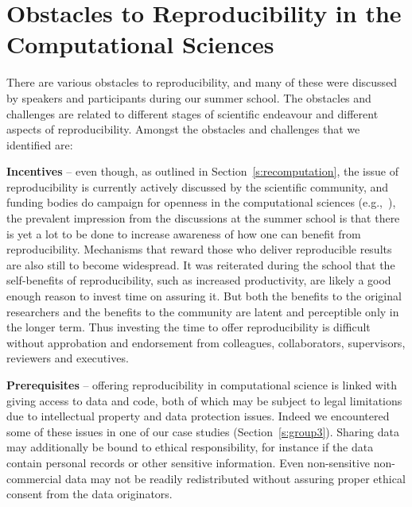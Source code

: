 \section{Obstacles to Reproducibility in the Computational Sciences}
\label{s:obstacles}

There are various obstacles to reproducibility, and many of these were
  discussed by speakers and participants during our summer school.
The obstacles and challenges are related to different stages of scientific 
  endeavour and different aspects of reproducibility.
Amongst the obstacles and challenges that we identified are:

{\bf Incentives} -- even though, as outlined in Section~\ref{s:recomputation}, 
  the issue of reproducibility is
  currently actively discussed by the scientific community, 
  and funding bodies do campaign for
  openness in the computational sciences (e.g.,~\cite{NSF}), 
  the prevalent impression from the discussions at 
  the summer school is that there is yet a lot to be done to increase 
  awareness of how one can benefit from reproducibility.
Mechanisms that reward those who deliver reproducible results are also
  still to become widespread.
It was reiterated during the school that the self-benefits 
  of reproducibility, such as increased productivity, are likely 
  a good enough reason to invest time on assuring it.
But both the benefits to the original researchers and the benefits to the community
  are latent and perceptible only in the longer term.
Thus investing the time to offer reproducibility is difficult without
  approbation and endorsement from colleagues, collaborators, supervisors,
  reviewers and executives.
  
{\bf Prerequisites} -- offering reproducibility in computational
  science is linked with giving access to data and code, both of which may
  be subject to legal limitations due to intellectual property and
  data protection issues. Indeed we encountered some of these issues
  in one of our case studies (Section~\ref{s:group3}).
Sharing data may additionally be bound to ethical responsibility, for instance
  if the data contain personal records or other sensitive information.  
Even non-sensitive non-commercial data may not be readily redistributed
  without assuring proper ethical consent from the data originators.

